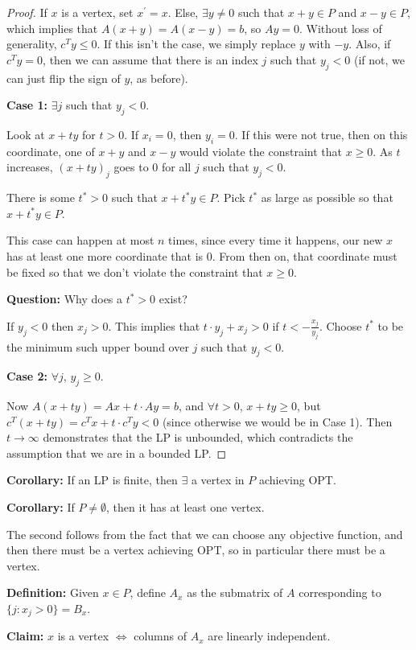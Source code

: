 \documentclass[11pt]{article}
\begin{document}
\begin{proof}
If $x$ is a vertex, set $x^{\prime}=x$. Else, $\exists y\ne 0$ such that $x+y\in P$ and $x-y\in P$, which implies that $A(x+y)=A(x-y)=b$, so $Ay=0$. Without loss of generality, $c^Ty\le 0$. If this isn't the case, we simply replace $y$ with $-y$. Also, if $c^Ty=0$, then we can assume that there is an index $j$ such that $y_j<0$ (if not, we can just flip the sign of $y$, as before).

{\bf Case 1:} $\exists j$ such that $y_j<0$.

Look at $x+ty$ for $t>0$. If $x_i=0$, then $y_i=0$. If this were not true, then on this coordinate, one of $x+y$ and $x-y$ would violate the constraint that $x\ge 0$. As $t$ increases, $(x+ty)_j$ goes to $0$ for all $j$ such that $y_j<0$.

There is some $t^*>0$ such that $x+t^*y\in P$. Pick $t^*$ as large as possible so that $x+t^*y\in P$.

This case can happen at most $n$ times, since every time it happens, our new $x$ has at least one more coordinate that is $0$. From then on, that coordinate must be fixed so that we don't violate the constraint that $x\ge 0$.

{\bf Question:} Why does a $t^*>0$ exist?

If $y_j<0$ then $x_j> 0$. This implies that $t\cdot y_j+x_j>0$ if $t< -\frac{x_j}{y_j}$. Choose $t^*$ to be the minimum such upper bound over $j$ such that $y_j<0$.

{\bf Case 2:} $\forall j$, $y_j\ge 0$.

Now $A(x+ty)=Ax+t\cdot Ay=b$, and $\forall t > 0$, $x+ty\ge 0$, but $c^T(x+ty)=c^Tx+t\cdot c^Ty<0$ (since otherwise we would be in Case 1). Then $t\to\infty$ demonstrates that the LP is unbounded, which contradicts the assumption that we are in a bounded LP.
\end{proof}

{\bf Corollary:} If an LP is finite, then $\exists$ a vertex in $P$ achieving OPT.

{\bf Corollary:} If $P\ne\emptyset$, then it has at least one vertex.

The second follows from the fact that we can choose any objective function, and then there must be a vertex achieving OPT, so in particular there must be a vertex.

{\bf Definition:} Given $x\in P$, define $A_x$ as the submatrix of $A$ corresponding to $\{j:x_j>0\}=B_x$.

{\bf Claim:} $x$ is a vertex $\iff$ columns of $A_x$ are linearly independent.
\end{document}
